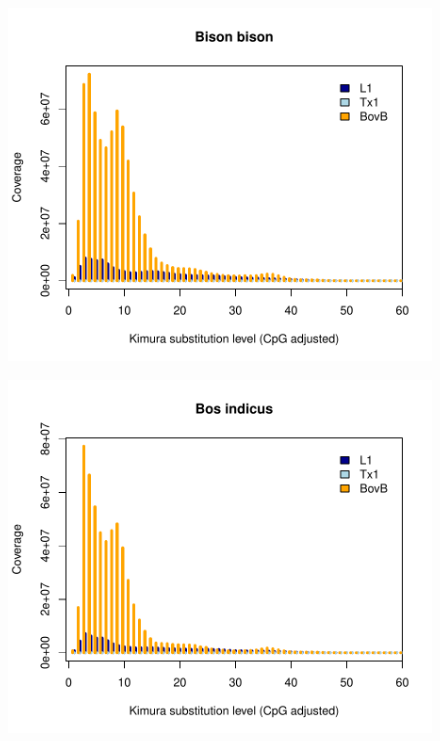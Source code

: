 \documentclass[12pt,a4paper,times]{article}
\begin{document}
\begin{figure}[H]
	\centering
	\includegraphics[scale=0.8]{suppFigures/divergencePlots/Bison_bison.pdf}
	\caption{\label{Bison}}
\end{figure}

\begin{figure}[H]
	\centering
	\includegraphics[scale=0.8]{suppFigures/divergencePlots/Bos_indicus.pdf}
	\caption{\label{BosI}}
\end{figure}
\end{document}
